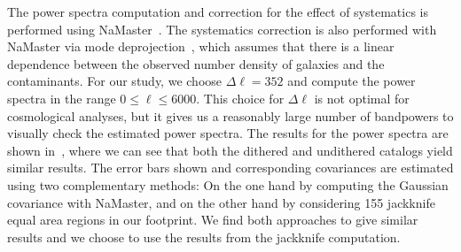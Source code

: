 \documentclass[\docopts]{\docclass}
\begin{document}
The power spectra computation and correction for the effect of systematics is performed using NaMaster~\citep{2019MNRAS.484.4127A}. The systematics correction is also performed with NaMaster via mode deprojection~\citep{2016MNRAS.456.2095E,2019MNRAS.484.4127A}, which assumes that there is a linear dependence between the observed number density of galaxies and the contaminants. For our study, we choose $\Delta \ell = 352$ and compute the power spectra in the range $0 \leq \ell \leq 6000$. This choice for $\Delta\ell$ is not optimal for cosmological analyses, but it gives us a reasonably large number of bandpowers to visually check the estimated power spectra. The results for the power spectra are shown in~, where we can see that both the dithered and undithered catalogs yield similar results. The error bars shown and corresponding covariances are estimated using two complementary methods: On the one hand by computing the Gaussian covariance with NaMaster, and on the other hand by considering 155 jackknife equal area regions in our footprint. We find both approaches to give similar results and we choose to use the results from the jackknife computation.
\end{document}

